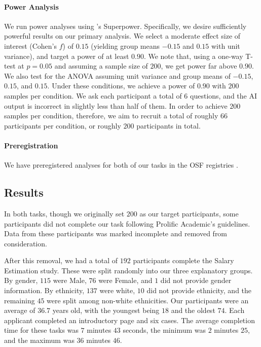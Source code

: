 \paragraph{Power Analysis}
We run power analyses using \textcite{caldwell_power_nodate}'s Superpower. Specifically, we desire sufficiently powerful results on our primary analysis. We select a moderate effect size of interest (Cohen’s $f$) of $0.15$ (yielding group means $-0.15$ and $0.15$ with unit variance), and target a power of at least $0.90$. We note that, using a one-way T-test at $p = 0.05$ and assuming a sample size of $200$, we get power far above $0.90$. We also test for the ANOVA assuming unit variance and group means of $-0.15$, $0.15$, and $0.15$. Under these conditions, we achieve a power of $0.90$ with $200$ samples per condition. We ask each participant a total of 6 questions, and the AI output is incorrect in slightly less than half of them. In order to achieve $200$ samples per condition, therefore, we aim to recruit a total of roughly $66$ participants per condition, or roughly $200$ participants in total.

\paragraph{Preregistration}
We have preregistered analyses for both of our tasks in the OSF registries \cite{natarajan_binns_2022}. 

\subsection{Results}\label{ssec:os_results}
In both tasks, though we originally set $200$ as our target participants, some participants did not complete our task following Prolific Academic's guidelines. Data from these participants was marked incomplete and removed from consideration. 

After this removal, we had a total of $192$ participants complete the Salary Estimation study. These were split randomly into our three explanatory groups. By gender, $115$ were Male, $76$ were Female, and $1$ did not provide gender information. By ethnicity, $137$ were white, $10$ did not provide ethnicity, and the remaining $45$ were split among non-white ethnicities. Our participants were an average of $36.7$ years old, with the youngest being $18$ and the oldest $74$. Each applicant completed an introductory page and six cases. The average completion time for these tasks was $7$ minutes $43$ seconds, the minimum was $2$ minutes $25$, and the maximum was $36$ minutes $46$.

